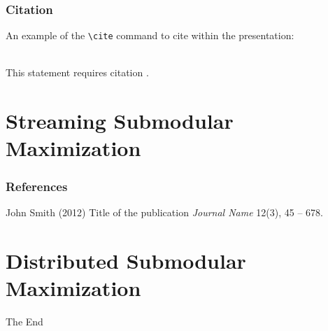 \documentclass{beamer}
\begin{document}

\begin{frame}[fragile] %
\frametitle{Citation}
An example of the \verb|\cite| command to cite within the presentation:\\~

This statement requires citation \cite{p1}.
\end{frame}

\section{Streaming Submodular Maximization}


\begin{frame}
\frametitle{References}
\footnotesize{
\begin{thebibliography}{99} %
 John Smith (2012)
\newblock Title of the publication
\newblock \emph{Journal Name} 12(3), 45 -- 678.
\end{thebibliography}
}
\end{frame}


\section{Distributed Submodular Maximization}


\begin{frame}
\Huge{\centerline{The End}}
\end{frame}

\end{document}

